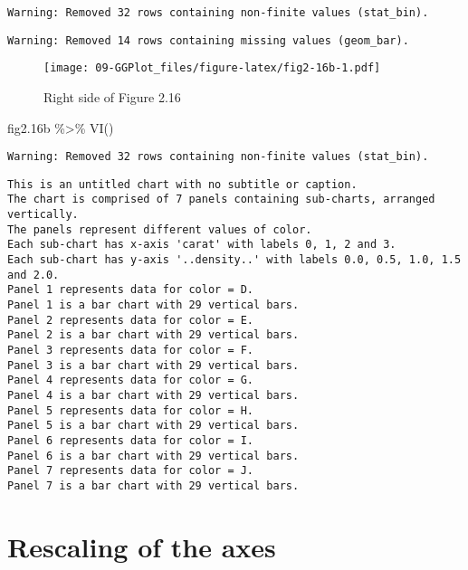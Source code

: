 \documentclass[
]{book}
\newenvironment{Shaded}{\begin{snugshade}}{\end{snugshade}}
\newcommand{\FloatTok}[1]{\textcolor[rgb]{0.00,0.00,0.81}{#1}}
\newcommand{\FunctionTok}[1]{\textcolor[rgb]{0.00,0.00,0.00}{#1}}
\newcommand{\NormalTok}[1]{#1}
\newcommand{\SpecialCharTok}[1]{\textcolor[rgb]{0.00,0.00,0.00}{#1}}
\begin{document}
\begin{verbatim}
Warning: Removed 32 rows containing non-finite values (stat_bin).
\end{verbatim}

\begin{verbatim}
Warning: Removed 14 rows containing missing values (geom_bar).
\end{verbatim}

\begin{figure}
\centering
\texttt{[image: 09-GGPlot\_files/figure-latex/fig2-16b-1.pdf]}
\caption{\label{fig:fig2-16b}Right side of Figure 2.16}
\end{figure}

\begin{Shaded}
\begin{Highlighting}[]
\NormalTok{fig2}\FloatTok{.16}\NormalTok{b }\SpecialCharTok{\%\textgreater{}\%} \FunctionTok{VI}\NormalTok{()   }
\end{Highlighting}
\end{Shaded}

\begin{verbatim}
Warning: Removed 32 rows containing non-finite values (stat_bin).
\end{verbatim}

\begin{verbatim}
This is an untitled chart with no subtitle or caption.
The chart is comprised of 7 panels containing sub-charts, arranged vertically.
The panels represent different values of color.
Each sub-chart has x-axis 'carat' with labels 0, 1, 2 and 3.
Each sub-chart has y-axis '..density..' with labels 0.0, 0.5, 1.0, 1.5 and 2.0.
Panel 1 represents data for color = D.
Panel 1 is a bar chart with 29 vertical bars.
Panel 2 represents data for color = E.
Panel 2 is a bar chart with 29 vertical bars.
Panel 3 represents data for color = F.
Panel 3 is a bar chart with 29 vertical bars.
Panel 4 represents data for color = G.
Panel 4 is a bar chart with 29 vertical bars.
Panel 5 represents data for color = H.
Panel 5 is a bar chart with 29 vertical bars.
Panel 6 represents data for color = I.
Panel 6 is a bar chart with 29 vertical bars.
Panel 7 represents data for color = J.
Panel 7 is a bar chart with 29 vertical bars.
\end{verbatim}

\hypertarget{rescaling-of-the-axes}{%
\section{Rescaling of the axes}\label{rescaling-of-the-axes}}
\end{document}
